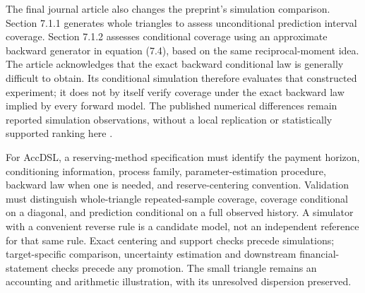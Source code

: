 The final journal article also changes the preprint's simulation comparison.
Section 7.1.1 generates whole triangles to assess unconditional prediction
interval coverage. Section 7.1.2 assesses conditional coverage using an
approximate backward generator in equation (7.4), based on the same
reciprocal-moment idea. The article acknowledges that the exact backward
conditional law is generally difficult to obtain. Its conditional simulation
therefore evaluates that constructed experiment; it does not by itself verify
coverage under the exact backward law implied by every forward model.
The published numerical differences remain reported simulation observations,
without a local replication or statistically supported ranking here
\citep[Section 7.1, Table 3 and Figures 1--3]{steinmetz2024bootstrap}.

For AccDSL, a reserving-method specification must identify the payment
horizon, conditioning information, process family, parameter-estimation
procedure, backward law when one is needed, and reserve-centering convention.
Validation must distinguish whole-triangle repeated-sample coverage,
coverage conditional on a diagonal, and prediction conditional on a full
observed history. A simulator with a convenient reverse rule is a candidate
model, not an independent reference for that same rule. Exact centering and
support checks precede simulations; target-specific comparison, uncertainty
estimation and downstream financial-statement checks precede any promotion.
The small triangle remains an accounting and arithmetic illustration, with
its unresolved dispersion preserved.
